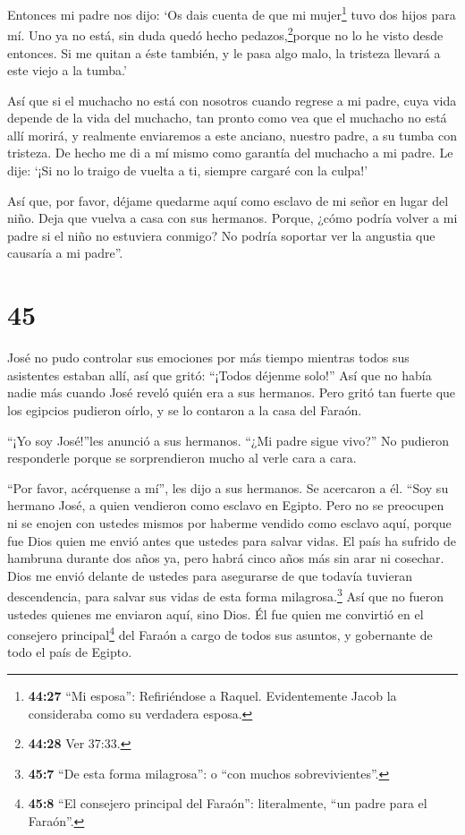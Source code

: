  Entonces mi padre nos dijo: `Os dais cuenta de que mi
mujer\footnote{\textbf{44:27} ``Mi esposa'': Refiriéndose a Raquel.
  Evidentemente Jacob la consideraba como su verdadera esposa.} tuvo dos
hijos para mí.  Uno ya no está, sin duda quedó hecho
pedazos,\footnote{\textbf{44:28} Ver 37:33.}porque no lo he visto desde
entonces.  Si me quitan a éste también, y le pasa algo
malo, la tristeza llevará a este viejo a la tumba.'

 Así que si el muchacho no está con nosotros cuando regrese
a mi padre, cuya vida depende de la vida del muchacho,  tan
pronto como vea que el muchacho no está allí morirá, y realmente
enviaremos a este anciano, nuestro padre, a su tumba con tristeza.
 De hecho me di a mí mismo como garantía del muchacho a mi
padre. Le dije: `¡Si no lo traigo de vuelta a ti, siempre cargaré con la
culpa!'

 Así que, por favor, déjame quedarme aquí como esclavo de
mi señor en lugar del niño. Deja que vuelva a casa con sus hermanos.
 Porque, ¿cómo podría volver a mi padre si el niño no
estuviera conmigo? No podría soportar ver la angustia que causaría a mi
padre''.

\hypertarget{section-44}{%
\section{45}\label{section-44}}

 José no pudo controlar sus emociones por más tiempo
mientras todos sus asistentes estaban allí, así que gritó: ``¡Todos
déjenme solo!'' Así que no había nadie más cuando José reveló quién era
a sus hermanos.  Pero gritó tan fuerte que los egipcios
pudieron oírlo, y se lo contaron a la casa del Faraón.

 ``¡Yo soy José!''les anunció a sus hermanos. ``¿Mi padre
sigue vivo?'' No pudieron responderle porque se sorprendieron mucho al
verle cara a cara.

 ``Por favor, acérquense a mí'', les dijo a sus hermanos. Se
acercaron a él. ``Soy su hermano José, a quien vendieron como esclavo en
Egipto.  Pero no se preocupen ni se enojen con ustedes
mismos por haberme vendido como esclavo aquí, porque fue Dios quien me
envió antes que ustedes para salvar vidas.  El país ha
sufrido de hambruna durante dos años ya, pero habrá cinco años más sin
arar ni cosechar.  Dios me envió delante de ustedes para
asegurarse de que todavía tuvieran descendencia, para salvar sus vidas
de esta forma milagrosa.\footnote{\textbf{45:7} ``De esta forma
  milagrosa'': o ``con muchos sobrevivientes''.}  Así que no
fueron ustedes quienes me enviaron aquí, sino Dios. Él fue quien me
convirtió en el consejero principal\footnote{\textbf{45:8} ``El
  consejero principal del Faraón'': literalmente, ``un padre para el
  Faraón''.} del Faraón a cargo de todos sus asuntos, y gobernante de
todo el país de Egipto.

